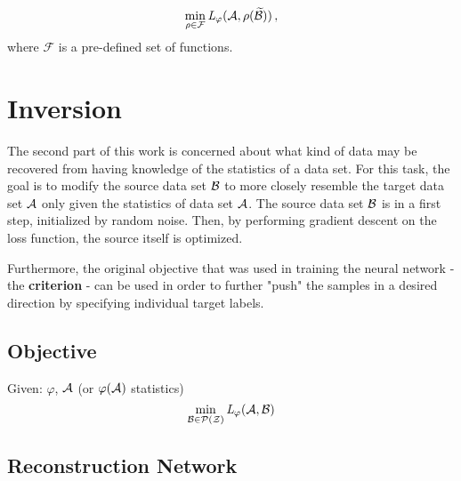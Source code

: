 \[
    \min_{\rho \in \mathcal{F}} \textit{L} _\varphi (\mathcal A, \rho(\widetilde{\mathcal B})) \,,
\]
where $\mathcal F$ is a pre-defined set of functions.








\section{Inversion}
\label{sec:Inversion}



The second part of this work is concerned about what kind of data may be recovered from 
having knowledge of the statistics of a data set.
For this task, the goal is to modify the source data set $\mathcal B$ to more closely resemble
the target data set $\mathcal A$ only given the statistics of data set $\mathcal A$.
The source data set $\mathcal B$ is in a first step, initialized by random noise.
Then, by performing gradient descent on the loss function, the source itself is optimized.

Furthermore, the original objective that was used in training the neural network - the \textbf{criterion} - can be used in order to further "push" the samples in a desired direction by specifying individual target labels.



\subsection{Objective}
Given: $\varphi$, $\mathcal A$ (or $\varphi(\mathcal A)$ statistics)
\[
    \min_{\mathcal B \in \mathcal P(\mathcal Z)} \textit{L} _\varphi (\mathcal A, \mathcal B)
\]
    

\subsection{Reconstruction Network}

\begin{minipage}{0.5\textwidth}

\end{minipage}
\begin{minipage}{0.5\textwidth}

\end{minipage}





